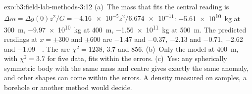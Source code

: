 \begin{solution}{exo:b3:field-lab-methods-3:12}
(a)~The mass that fits the central reading is $\Delta m = \Delta g(0)z^2/G
= \num{-4.16e-5}z^2/\num{6.674e-11}$: \qty{-5.61e10}{kg} at
\qty{300}{m}, \qty{-9.97e10}{kg} at \qty{400}{m}, \qty{-1.56e11}{kg} at
\qty{500}{m}. The predicted readings at $x = \pm300$ and $\pm600$ are
\num{-1.47} and \num{-0.37}, \num{-2.13} and \num{-0.71}, \num{-2.62}
and \qty{-1.09}{\milli\gal}. The  are $\chi^2 = 1238$, $3.7$ and
$856$. (b)~Only the model at \qty{400}{m}, with $\chi^2 = 3.7$ for five
data, fits within the errors. (c)~Yes: any spherically symmetric body
with the same mass and centre gives exactly the same anomaly, and other
shapes can come within the errors. A density measured on samples, a
borehole or another method would decide.
\end{solution}

